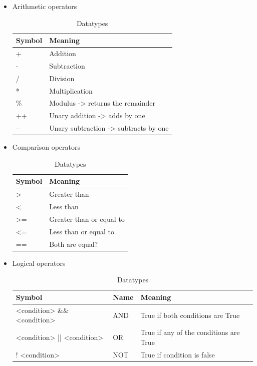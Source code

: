 \begin{itemize}
    \item Arithmetic operators
    \renewcommand{\arraystretch}{2}
    \begin{table}
    \centering
    \begin{tabular}{|l|l|}
    \hline
        Symbol & Meaning \\ \hline
        + & Addition \\ \hline
        - & Subtraction \\ \hline
        / & Division \\ \hline
        * & Multiplication \\ \hline
        \% & Modulus -> returns the remainder \\ \hline
        ++ & Unary addition -> adds by one \\ \hline
        -- & Unary subtraction -> subtracts by one \\ \hline
    \end{tabular}
     \caption{Datatypes}
    \label{datatypes}
\end{table}

    \item Comparison operators
    \begin{table}
    \centering
    \caption{Datatypes}
    \begin{tabular}{|l|l|}
    \hline
        Symbol & Meaning \\ \hline
        > & Greater than \\ \hline
        < & Less than \\ \hline
        >= & Greater than or equal to \\ \hline
        <= & Less than or equal to \\ \hline
        == & Both are equal? \\ \hline
    \end{tabular}
    \label{Comparision}
\end{table}
    
    
    \item Logical operators
    \begin{table}
    \centering
    \begin{tabular}{|l|l|l|}
    \hline
        Symbol & Name & Meaning \\ \hline
        <condition> \&\& <condition> & AND & True if both conditions are True \\ \hline
        <condition> || <condition> & OR & True if any of the conditions are True \\ \hline
        ! <condition> & NOT & True if condition is false \\ \hline
    \end{tabular}
    \caption{Datatypes}
    \label{datatypes}
\end{table}


\end{itemize}

